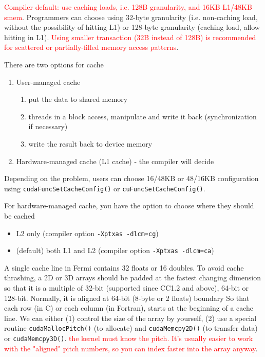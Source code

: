 \begin{framed}
  \textcolor{red}{Compiler default: use caching loads, i.e. 128B
    granularity, and 16KB L1/48KB smem}.
  Programmers can choose using 32-byte granularity (i.e. non-caching
  load, without the possibility of hitting L1) or 128-byte granularity
  (caching load, allow hitting in L1).
  \textcolor{red}{Using smaller transaction (32B instead of 128B) is
    recommended for scattered or partially-filled memory access
    patterns}.
\end{framed}

There are two options for cache
\begin{enumerate}
\item User-managed cache
  \begin{enumerate}
  \item put the data to shared memory
  \item threads in a block access, manipulate and write it back
    (synchronization if necessary)
  \item write the result back to device memory
  \end{enumerate}

\item Hardware-managed cache (L1 cache) - the compiler will decide
\end{enumerate}
Depending on the problem, users can choose 16/48KB or 48/16KB
configuration using \verb!cudaFuncSetCacheConfig()! or
\verb!cuFuncSetCacheConfig()!.

\begin{framed}
  For hardware-managed cache, you have the option to choose where they
  should be cached
  \begin{itemize}
  \item L2 only (compiler option \verb!-Xptxas -dlcm=cg!)
  \item (default) both L1 and L2 (compiler option
    \verb!-Xptxas -dlcm=ca!)
  \end{itemize}
\end{framed}

A single cache line in Fermi contains 32 floats or 16 doubles. To
avoid cache thrashing, a 2D or 3D arrays should be padded at the
fastest changing dimension so that it is a multiple of 32-bit
(supported since CC1.2 and above), 64-bit or 128-bit. Normally, it is
aligned at 64-bit (8-byte or 2 floats) boundary So that each row (in
C) or each column (in Fortran), starts at the beginning of a cache
line. We can either (1) control the size of the array by yourself, (2)
use a special routine \verb!cudaMallocPitch()! (to allocate) and
\verb!cudaMemcpy2D()! (to transfer data) or \verb!cudaMemcpy3D()!.
\textcolor{red}{the kernel must know the pitch. It's usually easier to
  work with the "aligned" pitch numbers, so you can index faster into
  the array anyway}.

